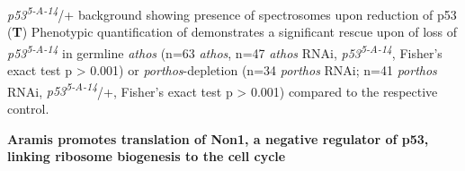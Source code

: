 \documentclass[12pt,oneside]{reedthesis}
\begin{document}
\emph{p53\textsuperscript{5-A-14}}/+ background showing presence of spectrosomes upon reduction of p53 (\textbf{T}) Phenotypic quantification of demonstrates a significant rescue upon of loss of \emph{p53\textsuperscript{5-A-14}} in germline \emph{athos} (n=63 \emph{athos}, n=47 \emph{athos} RNAi, \emph{p53\textsuperscript{5-A-14}}, Fisher's exact test p \textgreater{} 0.001) or \emph{porthos}-depletion (n=34 \emph{porthos} RNAi; n=41 \emph{porthos} RNAi, \emph{p53\textsuperscript{5-A-14}}/+, Fisher's exact test p \textgreater{} 0.001) compared to the respective control.


\textbf{\hfill\break
}

\textbf{Aramis promotes translation of Non1, a negative regulator of p53, linking ribosome biogenesis to the cell cycle}
\end{document}

